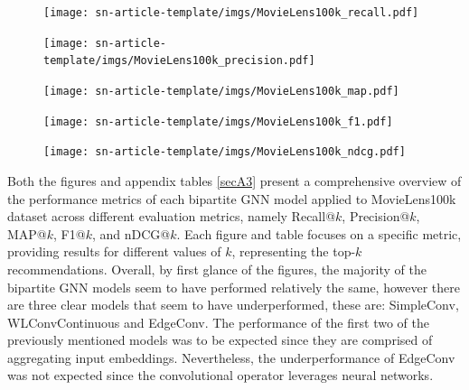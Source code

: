 \documentclass{scrartcl}
\begin{document}
\begin{figure}
\begin{center}
\begin{minipage}[b]{0.48\textwidth}
    \centering
    \texttt{[image: sn-article-template/imgs/MovieLens100k\_recall.pdf]}
    \label{fig:recall}
\end{minipage}
\hfill
\begin{minipage}[b]{0.48\textwidth}
    \centering
    \texttt{[image: sn-article-template/imgs/MovieLens100k\_precision.pdf]}
    \label{fig:precision}
\end{minipage}

\begin{minipage}[b]{0.48\textwidth}
    \centering
    \texttt{[image: sn-article-template/imgs/MovieLens100k\_map.pdf]}
    \label{fig:map}
\end{minipage}
\hfill
\begin{minipage}[b]{0.48\textwidth}
    \centering
    \texttt{[image: sn-article-template/imgs/MovieLens100k\_f1.pdf]}
    \label{fig:f1}
\end{minipage}

\begin{minipage}[b]{0.48\textwidth}
    \centering
    \texttt{[image: sn-article-template/imgs/MovieLens100k\_ndcg.pdf]}
    \label{fig:ndcg}
\end{minipage}
\end{center}
\end{figure}

\quad Both the figures and appendix tables \ref{secA3} present a comprehensive overview of the performance metrics of each bipartite GNN model applied to MovieLens100k dataset across different evaluation metrics, namely Recall@$k$, Precision@$k$, MAP@$k$, F1@$k$, and nDCG@$k$. Each figure and table focuses on a specific metric, providing results for different values of $k$, representing the top-$k$ recommendations. Overall, by first glance of the figures, the majority of the bipartite GNN models seem to have performed relatively the same, however there are three clear models that seem to have underperformed, these are: SimpleConv, WLConvContinuous and EdgeConv. The performance of the first two of the previously mentioned models was to be expected since they are comprised of aggregating input embeddings. Nevertheless, the underperformance of EdgeConv was not expected since the convolutional operator leverages neural networks.
\end{document}

